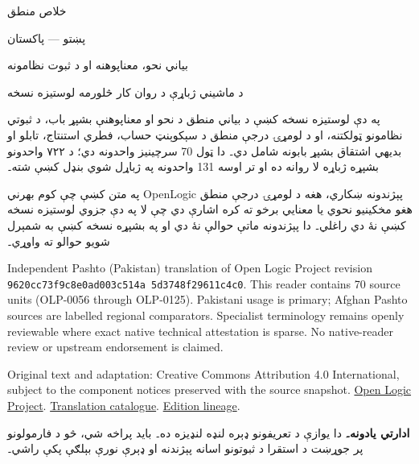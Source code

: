 \documentclass[12pt,a4paper,oneside]{report}
\theoremstyle{definition}
\newenvironment{editorial}{\begin{framed}\textbf{ادارتي يادونه۔}\enspace}{\end{framed}}
\begin{document}
\setRTL
\begin{titlepage}
\thispagestyle{empty}
\begin{center}
\vspace*{24mm}
{\Huge خلاص منطق}\par\bigskip
{\Large پښتو — پاکستان}\par\bigskip
{\LARGE بياني نحو، معناپوهنه او د ثبوت نظامونه}\par\bigskip
د ماشيني ژباړې د روان کار څلورمه لوستيزه نسخه
\end{center}
\bigskip
په دې لوستيزه نسخه کښې د بياني منطق د نحو او معناپوهنې بشپړ باب،
د ثبوتي نظامونو ټولکتنه، او د لومړۍ درجې منطق د سېکوېنټ حساب، فطري
استنتاج، تابلو او بديهي اشتقاق بشپړ بابونه شامل دي۔ دا ټول
70 سرچينيز واحدونه دي؛ د ۷۲۲ واحدونو بشپړه ژباړه لا
روانه ده او تر اوسه 131 واحدونه په ژباړل شوي بنډل کښې
شته۔

په متن کښې چې کوم بهرني OpenLogic پېژندونه ښکاري، هغه د لومړۍ درجې
منطق هغو مخکينيو نحوي يا معنايي برخو ته کره اشارې دي چې لا په دې
جزوي لوستيزه نسخه کښې نۀ دي راغلي۔ دا پېژندونه ماتې حوالې نۀ دي او
په بشپړه نسخه کښې به شمېرل شويو حوالو ته واوړي۔

\begin{LTR}\latinfont\small
Independent Pashto (Pakistan) translation of Open Logic Project revision
\texttt{9620cc73\allowbreak f9c8e0ad\allowbreak 003c514a\allowbreak
5d3748f2\allowbreak 9611c4c0}. This reader contains
70 source units (OLP-0056 through OLP-0125). Pakistani usage is
primary; Afghan Pashto sources are labelled regional comparators. Specialist
terminology remains openly reviewable where exact native technical attestation
is sparse. No native-reader review or upstream endorsement is claimed.

Original text and adaptation: Creative Commons Attribution 4.0 International,
subject to the component notices preserved with the source snapshot.
\href{https://openlogicproject.org/}{Open Logic Project}.\quad
\href{https://github.com/KokunoYumeto/OpenLogic-translations}{Translation catalogue}.\quad
\href{https://doi.org/10.5281/zenodo.22307197}{Edition lineage}.
\end{LTR}
\end{titlepage}
\tableofcontents
\clearpage


\label{olpseg:OLP-0056-B004:start}
\label{olpseg:OLP-0056-B004:end}

\label{olpseg:OLP-0056-B005:start}
\begin{editorial}
  دا يوازې د تعريفونو ډېره لنډه لنډيزه ده۔ بايد پراخه شي، څو د
  فارمولونو پر جوړښت د استقرا د ثبوتونو اسانه پېژندنه او ډېرې نورې
  بېلګې پکې راشي۔
\end{editorial}
\label{olpseg:OLP-0056-B005:end}
\end{document}

